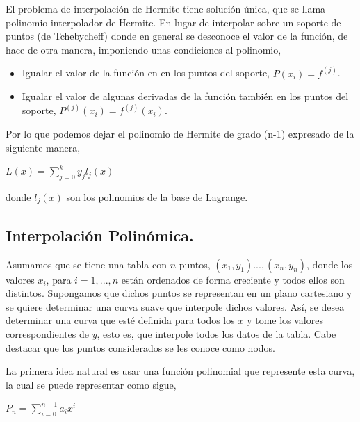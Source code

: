 \hspace{0.4cm} El problema de interpolaci\'on de Hermite tiene soluci\'on \'unica, que se llama polinomio interpolador de Hermite. En lugar de interpolar sobre un soporte de puntos (de Tchebycheff) donde en general se desconoce el valor de la funci\'on, de hace de otra manera, imponiendo unas condiciones al polinomio,

\begin{itemize}
  \item  Igualar el valor de la funci\'on en en los puntos del soporte, $P (x_{i}) = f^{(j)}$.
  \item Igualar el valor de algunas derivadas de la funci\'on tambi\'en en los puntos del soporte, $P^{(j)} (x_{i}) = f^{(j)} (x_{i})$.
\end{itemize}

\hspace{0.4cm} Por lo que podemos dejar el polinomio de Hermite de grado (n-1) expresado de la siguiente manera,

\begin{center}
$\displaystyle{L(x) = \sum_{j=0}^{k} y_{j} l_{j} (x) }$
\end{center}

\noindent donde $l_{j}(x)$ son los polinomios de la base de Lagrange.


\subsection{Interpolaci\'on Polin\'omica.\\}

\hspace{0.4cm}Asumamos que se tiene una tabla con $n$ puntos, $(x_{1},y_{1})...,(x_{n},y_{n})$, donde los valores $x_{i}$, para $i=1,...,n$ est\'an ordenados de forma creciente y todos ellos son distintos. Supongamos que dichos puntos se representan en un plano cartesiano y se quiere determinar una curva suave que interpole dichos valores. As\'i, se desea determinar una curva que est\'e definida para todos los $x$ y tome los valores correspondientes de $y$, esto es, que interpole todos los datos de la tabla. Cabe destacar que los puntos considerados se les conoce como nodos.


\hspace{0.4cm} La primera idea natural es usar una funci\'on polinomial que represente esta curva, la cual se puede representar como sigue,

\vspace{0.5cm}
\begin{center}

$\displaystyle{P_{n} = \sum_{i=0}^{n-1} a_{i}x^{i}}$

\end{center}

